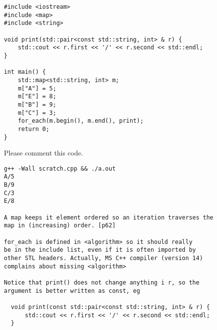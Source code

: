 \documentclass[landscape]{slides}
\begin{document}
\begin{slide}
\begin{lstlisting}
#include <iostream>
#include <map>
#include <string>

void print(std::pair<const std::string, int> & r) {
    std::cout << r.first << '/' << r.second << std::endl;
}

int main() {
    std::map<std::string, int> m;
    m["A"] = 5;
    m["E"] = 8;
    m["B"] = 9;
    m["C"] = 3;
    for_each(m.begin(), m.end(), print);
    return 0;
}
\end{lstlisting}

Please comment this code.
\begin{note}
\begin{tiny}
\begin{verbatim}
g++ -Wall scratch.cpp && ./a.out
A/5
B/9
C/3
E/8

A map keeps it element ordered so an iteration traverses the
map in (increasing) order. [p62]

for_each is defined in <algorithm> so it should really
be in the include list, even if it is often imported by 
other STL headers. Actually, MS C++ compiler (version 14) 
complains about missing <algorithm>

Notice that print() does not change anything i r, so the
argument is better written as const, eg

  void print(const std::pair<const std::string, int> & r) {
      std::cout << r.first << '/' << r.second << std::endl;
  }

\end{verbatim}
\end{tiny}
\end{note}
\end{slide}

\end{document}
